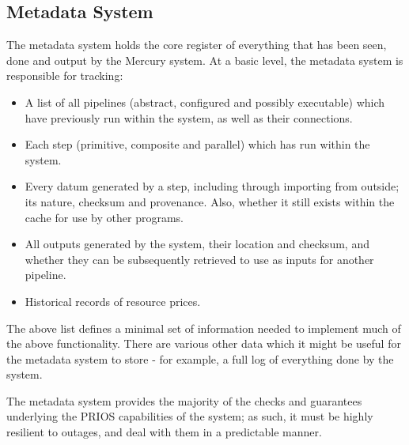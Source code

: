 \documentclass[10pt,a4paper]{article}
\newcommand{\npar}{\par\noindent\space}
\begin{document}
\subsection{Metadata System}
\label{sec:metadataSystem}
\npar The metadata system holds the core register of everything that has been seen, done and output by the Mercury system. At a basic level, the metadata system is responsible for tracking:
\begin{itemize}
\item A list of all pipelines (abstract, configured and possibly executable) which have previously run within the system, as well as their connections.
\item Each step (primitive, composite and parallel) which has run within the system.
\item Every datum generated by a step, including through importing from outside; its nature, checksum and provenance. Also, whether it still exists within the cache for use by other programs.
\item All outputs generated by the system, their location and checksum, and whether they can be subsequently retrieved to use as inputs for another pipeline.
\item Historical records of resource prices.
\end{itemize}
\npar The above list defines a minimal set of information needed to implement much of the above functionality. There are various other data which it might be useful for the metadata system to store - for example, a full log of everything done by the system.
\npar The metadata system provides the majority of the checks and guarantees underlying the PRIOS capabilities of the system; as such, it must be highly resilient to outages, and deal with them in a predictable manner.
\end{document}

